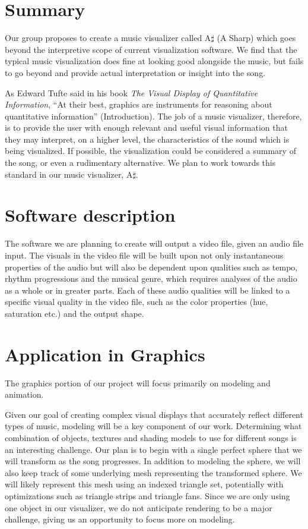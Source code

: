 \documentclass{article}
\begin{document}
\section{Summary}

Our group proposes to create a music visualizer called A$\sharp$ (A Sharp) which goes beyond the interpretive scope of current visualization software.  We find that the typical music visualization does fine at looking good alongside the music, but fails to go beyond and provide actual interpretation or insight into the song.

As Edward Tufte said in his book \textit{The Visual Display of Quantitative Information}, ``At their best, graphics are instruments for reasoning about quantitative information'' (Introduction).  The job of a music visualizer, therefore, is to provide the user with enough relevant and useful visual information that they may interpret, on a higher level, the characteristics of the sound which is being visualized.  If possible, the visualization could be considered a summary of the song, or even a rudimentary alternative.  We plan to work towards this standard in our music visualizer, A$\sharp$.

\section{Software description}

The software we are planning to create will output a video file, given an audio file input. The visuals in the video file will be built upon not only instantaneous properties of the audio but will also be dependent upon qualities such as tempo, rhythm progressions and the musical genre, which requires analyses of the audio as a whole or in greater parts. Each of these audio qualities will be linked to a specific visual quality in the video file, such as the color properties (hue, saturation etc.) and the output shape.

\section{Application in Graphics}

The graphics portion of our project will focus primarily on modeling and animation.
 
Given our goal of creating complex visual displays that accurately reflect different types of music, modeling will be a key component of our work. Determining what combination of objects, textures and shading models to use for different songs is an interesting challenge. Our plan is to begin with a single perfect sphere that we will transform as the song progresses. In addition to modeling the sphere, we will also keep track of some underlying mesh representing the transformed sphere. We will likely represent this mesh using an indexed triangle set, potentially with optimizations such as triangle strips and triangle fans. Since we are only using one object in our visualizer, we do not anticipate rendering to be a major challenge, giving us an opportunity to focus more on modeling. 
 
\end{document}
